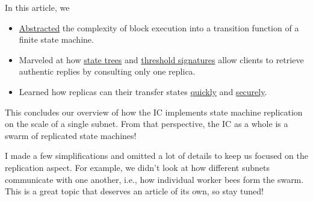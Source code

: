 \documentclass{article}
\begin{document}
In this article, we
\begin{itemize}
\item \href{#state-machine}{Abstracted} the complexity of block execution into a transition function of a finite state machine.
\item Marveled at how \href{#state-trees}{state trees} and \href{https://en.wikipedia.org/wiki/Threshold_cryptosystem}{threshold signatures} allow clients to retrieve authentic replies by consulting only one replica.
\item Learned how replicas can their transfer states \href{#incremental-sync}{quickly} and \href{#trigger-transfer}{securely}.
\end{itemize}

This concludes our overview of how the IC implements state machine replication on the scale of a single subnet.
From that perspective, the IC as a whole is a swarm of replicated state machines!

I made a few simplifications and omitted a lot of details to keep us focused on the replication aspect.
For example, we didn't look at how different subnets communicate with one another, i.e., how individual worker bees form the swarm.
This is a great topic that deserves an article of its own, so stay tuned!
\end{document}

